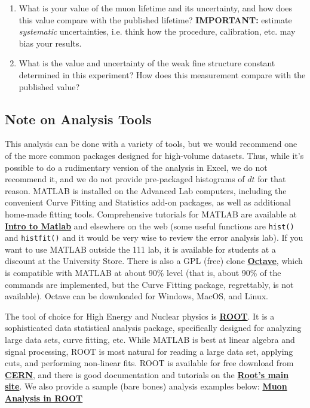 \documentclass{../lab}
\begin{document}
\begin{enumerate}
\begin{itemize}
    \end{itemize}

    \item What is your value of the muon lifetime and its uncertainty, and how does this value compare with the published lifetime? \textbf{IMPORTANT:} estimate \emph{systematic} uncertainties, i.e. think how the procedure, calibration, etc. may bias your results.

    \item What is the value and uncertainty of the weak fine structure constant determined in this experiment? How does this measurement compare with the published value?

\end{enumerate}

\subsection{Note on Analysis Tools}

\newpage

This analysis can be done with a variety of tools, but we would recommend one of the more common packages designed for high-volume datasets. Thus, while it's possible to do a rudimentary version of the analysis in Excel, we do not recommend it, and we do not provide pre-packaged histograms of $dt$ for that reason. MATLAB is installed on the Advanced Lab computers, including the convenient Curve Fitting and Statistics add-on packages, as well as additional home-made fitting tools. Comprehensive tutorials for MATLAB are available at \href{http://experimentationlab.berkeley.edu/matlabintro}{\textbf{Intro to Matlab}} and elsewhere on the web (some useful functions are \texttt{hist()} and \texttt{histfit()} and it would be very wise to review the error analysis lab). If you want to use MATLAB outside the 111 lab, it is available for students at a discount at the University Store. There is also a GPL (free) clone \href{http://www.gnu.org/software/octave/}{\textbf{Octave}}, which is compatible with MATLAB at about 90\% level (that is, about 90\% of the commands are implemented, but the Curve Fitting package, regrettably, is not available). Octave can be downloaded for Windows, MacOS, and Linux.

The tool of choice for High Energy and Nuclear physics is \href{http://root.cern.ch}{\textbf{ROOT}}. It is a sophisticated data statistical analysis package, specifically designed for analyzing large data sets, curve fitting, etc. While MATLAB is best at linear algebra and signal processing, ROOT is most natural for reading a large data set, applying cuts, and performing non-linear fits. ROOT is available for free download from \href{https://root.cern.ch/drupal/content/downloading-root}{\textbf{CERN}}, and there is good documentation and tutorials on the \href{http://root.cern.ch}{\textbf{Root's main site}}. We also provide a sample (bare bones) analysis examples below: \href{http://experimentationlab.berkeley.edu/node/90}{\textbf{Muon Analysis in ROOT}}
\end{document}
